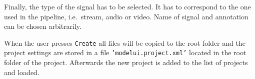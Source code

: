 Finally, the type of the signal has to be selected. It has to correspond to the one used in the pipeline, i.e.\ stream, audio or video. Name of signal and annotation can be chosen arbitrarily.

When the user presses \texttt{Create} all files will be copied to the root folder and the project settings are stored in a file \texttt{'modelui.project.xml'} located in the root folder of the project. Afterwards the new project is added to the list of projects and loaded.


